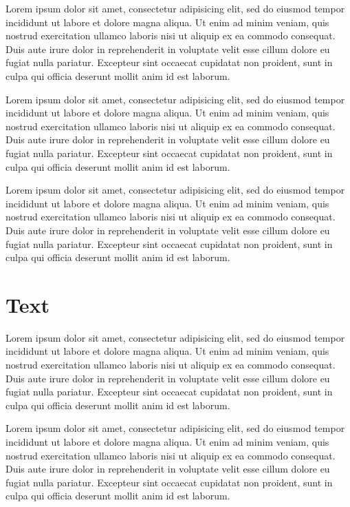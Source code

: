 \documentclass[10pt,a4paper,extrafontsizes,oldfontcommands,oneside]{memoir}
\begin{document}
\clearpage
Lorem ipsum dolor sit amet, consectetur adipisicing elit, sed do eiusmod tempor incididunt ut labore et dolore magna aliqua. Ut enim ad minim veniam, quis nostrud exercitation ullamco laboris nisi ut aliquip ex ea commodo consequat. Duis aute irure dolor in reprehenderit in voluptate velit esse cillum dolore eu fugiat nulla pariatur. Excepteur sint occaecat cupidatat non proident, sunt in culpa qui officia deserunt mollit anim id est laborum.

\clearpage
Lorem ipsum dolor sit amet, consectetur adipisicing elit, sed do eiusmod tempor incididunt ut labore et dolore magna aliqua. Ut enim ad minim veniam, quis nostrud exercitation ullamco laboris nisi ut aliquip ex ea commodo consequat. Duis aute irure dolor in reprehenderit in voluptate velit esse cillum dolore eu fugiat nulla pariatur. Excepteur sint occaecat cupidatat non proident, sunt in culpa qui officia deserunt mollit anim id est laborum.

\clearpage
Lorem ipsum dolor sit amet, consectetur adipisicing elit, sed do eiusmod tempor incididunt ut labore et dolore magna aliqua. Ut enim ad minim veniam, quis nostrud exercitation ullamco laboris nisi ut aliquip ex ea commodo consequat. Duis aute irure dolor in reprehenderit in voluptate velit esse cillum dolore eu fugiat nulla pariatur. Excepteur sint occaecat cupidatat non proident, sunt in culpa qui officia deserunt mollit anim id est laborum.


\section{Text} %
\label{sec:text}



Lorem ipsum dolor sit amet, consectetur adipisicing elit, sed do eiusmod tempor incididunt ut labore et dolore magna aliqua. Ut enim ad minim veniam, quis nostrud exercitation ullamco laboris nisi ut aliquip ex ea commodo consequat. Duis aute irure dolor in reprehenderit in voluptate velit esse cillum dolore eu fugiat nulla pariatur. Excepteur sint occaecat cupidatat non proident, sunt in culpa qui officia deserunt mollit anim id est laborum.


Lorem ipsum dolor sit amet, consectetur adipisicing elit, sed do eiusmod tempor incididunt ut labore et dolore magna aliqua. Ut enim ad minim veniam, quis nostrud exercitation ullamco laboris nisi ut aliquip ex ea commodo consequat. Duis aute irure dolor in reprehenderit in voluptate velit esse cillum dolore eu fugiat nulla pariatur. Excepteur sint occaecat cupidatat non proident, sunt in culpa qui officia deserunt mollit anim id est laborum.
\end{document}
